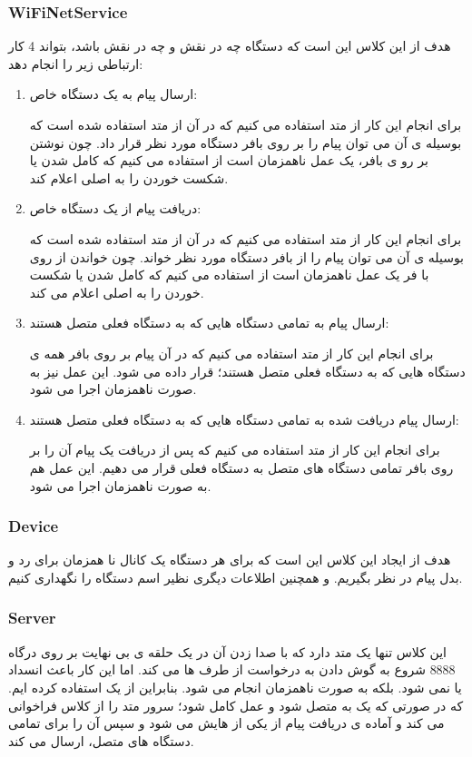 \subsubsection{WiFiNetService}
هدف از این کلاس این است که دستگاه چه در نقش 
و چه در نقش 
باشد، بتواند 4 کار ارتباطی زیر را انجام دهد:
\begin{enumerate}
	\item ارسال پیام به یک دستگاه خاص:
	
	برای انجام این کار از متد
	استفاده می کنیم که در آن از متد 
	استفاده شده است که بوسیله ی آن می توان پیام را بر روی بافر دستگاه مورد نظر قرار داد. چون نوشتن بر رو ی بافر، یک عمل ناهمزمان است از
	استفاده می کنیم که کامل شدن یا شکست خوردن را به 
	اصلی اعلام کند.
	\item دریافت پیام از یک دستگاه خاص:
	
	برای انجام این کار از متد
	استفاده می کنیم که در آن از متد
	استفاده شده است که بوسیله ی آن می توان پیام را از بافر دستگاه مورد نظر خواند. چون خواندن از روی با فر یک عمل ناهمزمان است از 
	استفاده می کنیم که کامل شدن یا شکست خوردن را به 
	اصلی اعلام می کند.
	
	\item ارسال پیام به تمامی دستگاه هایی که به دستگاه فعلی متصل هستند:

برای انجام این کار از متد
استفاده می کنیم که در آن پیام بر روی بافر همه ی دستگاه هایی که به دستگاه فعلی متصل هستند؛ قرار داده می شود. این عمل نیز به صورت ناهمزمان اجرا می شود.

	\item ارسال پیام  دریافت شده به تمامی دستگاه هایی که به دستگاه فعلی متصل هستند:
	
	برای انجام این کار از متد
	استفاده می کنیم که پس از دریافت یک پیام آن را بر روی بافر تمامی دستگاه های متصل به دستگاه فعلی قرار می دهیم. این عمل هم به صورت ناهمزمان اجرا می شود.
	
\end{enumerate}
\subsubsection{Device}
هدف از ایجاد این کلاس این است که برای هر دستگاه یک کانال نا همزمان 
برای رد و بدل پیام در نظر بگیریم. و همچنین اطلاعات دیگری نظیر اسم دستگاه را نگهداری کنیم.
\subsubsection{Server}
این کلاس تنها یک متد
 دارد که با صدا زدن آن 
 در یک حلقه ی بی نهایت بر روی درگاه 8888 شروع به گوش دادن به درخواست  از طرف 
 ها می کند. اما این کار باعث انسداد یا 
نمی شود. بلکه به صورت ناهمزمان انجام می شود. بنابراین از یک 
استفاده کرده ایم. که در صورتی که یک 
به 
متصل شود و عمل کامل شود؛ سرور متد 
را از کلاس 
فراخوانی می کند و آماده ی دریافت پیام از یکی از 
هایش می شود و سپس آن را برای تمامی دستگاه های متصل، ارسال می کند.

